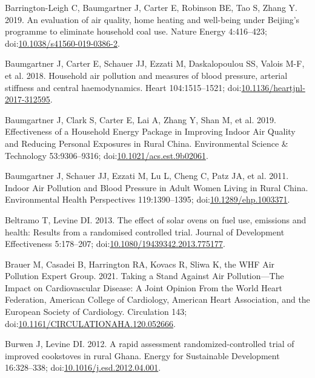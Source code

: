 \documentclass[
  letterpaper,
  DIV=11,
  numbers=noendperiod]{scrartcl}
\newlength{\cslhangindent}
\newenvironment{CSLReferences}[2] %
 {\begin{list}{}{%
  \setlength{\itemindent}{0pt}
  \setlength{\leftmargin}{0pt}
  \setlength{\parsep}{0pt}
  \ifodd #1
   \setlength{\leftmargin}{\cslhangindent}
   \setlength{\itemindent}{-1\cslhangindent}
  \fi
  \setlength{\itemsep}{#2\baselineskip}}}
 {\end{list}}
\begin{document}
\begin{CSLReferences}{1}{1}
Barrington-Leigh C, Baumgartner J, Carter E, Robinson BE, Tao S, Zhang
Y. 2019. An evaluation of air quality, home heating and well-being under
{Beijing}'s programme to eliminate household coal use. Nature Energy
4:416--423;
doi:\href{https://doi.org/10.1038/s41560-019-0386-2}{10.1038/s41560-019-0386-2}.

Baumgartner J, Carter E, Schauer JJ, Ezzati M, Daskalopoulou SS, Valois
M-F, et al. 2018. Household air pollution and measures of blood
pressure, arterial stiffness and central haemodynamics. Heart
104:1515--1521;
doi:\href{https://doi.org/10.1136/heartjnl-2017-312595}{10.1136/heartjnl-2017-312595}.

Baumgartner J, Clark S, Carter E, Lai A, Zhang Y, Shan M, et al. 2019.
Effectiveness of a {Household Energy Package} in {Improving Indoor Air
Quality} and {Reducing Personal Exposures} in {Rural China}.
Environmental Science \& Technology 53:9306--9316;
doi:\href{https://doi.org/10.1021/acs.est.9b02061}{10.1021/acs.est.9b02061}.

Baumgartner J, Schauer JJ, Ezzati M, Lu L, Cheng C, Patz JA, et al.
2011. Indoor {Air Pollution} and {Blood Pressure} in {Adult Women
Living} in {Rural China}. Environmental Health Perspectives
119:1390--1395;
doi:\href{https://doi.org/10.1289/ehp.1003371}{10.1289/ehp.1003371}.

Beltramo T, Levine DI. 2013. The effect of solar ovens on fuel use,
emissions and health: Results from a randomised controlled trial.
Journal of Development Effectiveness 5:178--207;
doi:\href{https://doi.org/10.1080/19439342.2013.775177}{10.1080/19439342.2013.775177}.

Brauer M, Casadei B, Harrington RA, Kovacs R, Sliwa K, the WHF Air
Pollution Expert Group. 2021. Taking a {Stand Against Air
Pollution}---{The Impact} on {Cardiovascular Disease}: {A Joint Opinion
From} the {World Heart Federation}, {American College} of {Cardiology},
{American Heart Association}, and the {European Society} of
{Cardiology}. Circulation 143;
doi:\href{https://doi.org/10.1161/CIRCULATIONAHA.120.052666}{10.1161/CIRCULATIONAHA.120.052666}.

Burwen J, Levine DI. 2012. A rapid assessment randomized-controlled
trial of improved cookstoves in rural {Ghana}. Energy for Sustainable
Development 16:328--338;
doi:\href{https://doi.org/10.1016/j.esd.2012.04.001}{10.1016/j.esd.2012.04.001}.


\end{CSLReferences}
\end{document}
